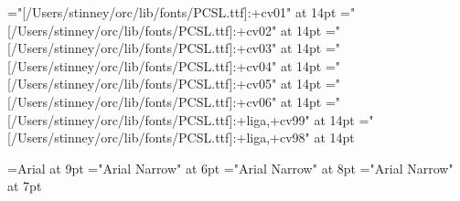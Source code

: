 \font\pccvi="[/Users/stinney/orc/lib/fonts/PCSL.ttf]:+cv01" at 14pt
\font\pccvii="[/Users/stinney/orc/lib/fonts/PCSL.ttf]:+cv02" at 14pt
\font\pccviii="[/Users/stinney/orc/lib/fonts/PCSL.ttf]:+cv03" at 14pt
\font\pccviv="[/Users/stinney/orc/lib/fonts/PCSL.ttf]:+cv04" at 14pt
\font\pccvv="[/Users/stinney/orc/lib/fonts/PCSL.ttf]:+cv05" at 14pt
\font\pccvvi="[/Users/stinney/orc/lib/fonts/PCSL.ttf]:+cv06" at 14pt
\font\pccvxcix="[/Users/stinney/orc/lib/fonts/PCSL.ttf]:+liga,+cv99" at 14pt
\font\pccvxcviii="[/Users/stinney/orc/lib/fonts/PCSL.ttf]:+liga,+cv98" at 14pt

\let\redpc\pcfee
\let\newgh\pcblu

\font\helv=Arial at 9pt
\font\helvx="Arial Narrow" at 6pt
\font\helvy="Arial Narrow" at 8pt
\font\helvz="Arial Narrow" at 7pt

\let\everymathextra\relax
\let\preamble\relax


\def\appendixstr{Appendix }


\let\seq\relax
\let\lname\relax
\let\sname\relax
\let\uname\relax
\let\chars\relax
\let\names\relax
\let\glyph\relax
\let\rglyf\relax
\let\image\relax
\let\notes\relax
\let\stags\relax

\let\sqdbcun\relax
\let\sqdbpua\relax
\let\sqseq\relax
\let\sqinv\relax
\let\sqchr\relax

\let\imagefloat\relax
\let\imagecaption\relax

\let\remfor\relax
\let\Hhhhh\relax

\def\unames{\eight\rm}

\def\ofs#1#2#3{}
\let\ofspc\pcxxv

\def\ccchr{\pccc}
\def\ccuni{\helvx}
\let\ccempty\relax

\def\beginchartlist{\begin{2column}\offinterlineskip} %
\def\endchartlist{\end{2column}\vfil\supereject}

\def\cclrow#1#2#3{%
        \vbox{\hsize3.2in\parindent0pt
              \hbox to 3.2in{%
              \hbox to .4in{\helvy#1\hfil}%
              \hbox to .4in{\pccc#2\hss}%
              \hbox to 2.4in{\hsize2.4in\vtop{\par\helvy\leavevmode\rightskip0pt plus1fil\relax#3\endgraf}}%
                            \hfil}}\vfil}
\def\cclnum#1{{\helv#1}}
\def\cclchr{\redpc}%
\def\ccluni{\Sans\eight\rm}

